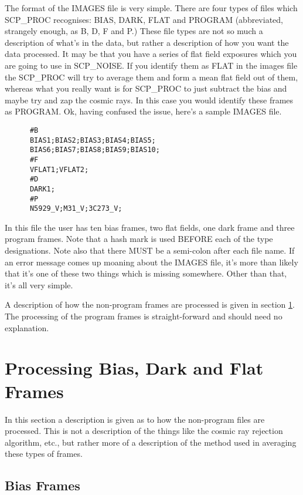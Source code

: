 The format of the IMAGES file is very simple.  There are four types of files
which SCP\_PROC recognises: BIAS, DARK, FLAT and PROGRAM (abbreviated,
strangely enough, as B, D, F and P.)  These file types are not so much a
description of what's in the data, but rather a description of how you want the
data processed.  It may be that you have a series of flat field exposures which
you are going to use in SCP\_NOISE. If you identify them as FLAT in the images
file the SCP\_PROC will try to average them and form a mean flat field out of
them, whereas what you really want is for SCP\_PROC to just subtract the bias
and maybe try and zap the cosmic rays.  In this case you would identify these
frames as PROGRAM.  Ok, having confused the issue, here's a sample IMAGES file.

\begin{verbatim}
      #B
      BIAS1;BIAS2;BIAS3;BIAS4;BIAS5;
      BIAS6;BIAS7;BIAS8;BIAS9;BIAS10;
      #F
      VFLAT1;VFLAT2;
      #D
      DARK1;
      #P
      N5929_V;M31_V;3C273_V;
\end{verbatim}

In this file the user has ten bias frames, two flat fields, one dark frame and
three program frames.  Note that a hash mark is used BEFORE each of the type
designations. Note also that there MUST be a semi-colon after each file name.
If an error message comes up moaning about the IMAGES file, it's more than
likely that it's one of these two things which is missing somewhere. Other than
that, it's all very simple.

A description of how the non-program frames are processed is given in section
\ref{sec:proc_flat}.  The processing of the program frames is straight-forward
and should need no explanation.

\section{Processing Bias, Dark and Flat Frames} \label{sec:proc_flat}

In this section a description is given as to how the non-program files are
processed.  This is not a description of the things like the cosmic ray
rejection algorithm, etc., but rather more of a description of the method  used
in averaging these types of frames.

\subsection{Bias Frames}

